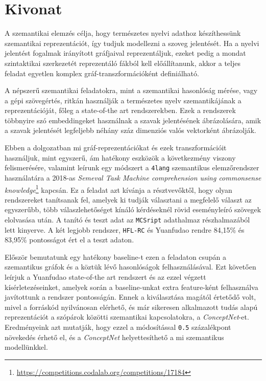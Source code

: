 \chapter*{Kivonat}
A szemantikai elemzés célja, hogy természetes nyelvi adathoz készíthessünk szemantikai reprezentációt, 
így tudjuk modellezni a szoveg jelentését. Ha a nyelvi jelentést fogalmak irányított gráfjaival reprezentáljuk,
ezeket pedig a mondat szintaktikai szerkezetét reprezentáló fákból kell előállítanunk, akkor a teljes feladat egyetlen komplex
gráf-transzformációként definiálható.

A népszerű szemantikai feladatokra, mint a szemantikai hasonlóság mérése, vagy a gépi szövegértés, ritkán használják a természetes
nyelv szemantikájának a reprezentációját, főleg a state-of-the art rendszerekben. Ezek a rendszerek többnyire szó embeddingeket használnak a szavak jelentésének
ábrázolására, amik a szavak jelentését legfeljebb néhány száz dimenziós valós vektorként ábrázolják.

Ebben a dolgozatban mi gráf-reprezentációkat és ezek transzformációit használjuk, mint egyszerű, ám hatékony
eszközök a következmény viszony felismerésére, valamint leírunk egy módszert a \texttt{4lang} szemantikus elemzőrendszer\cite{Recski:2016d} használatára a 2018-as \textit{Semeval Task Machine comprehension using commonsense knowledge}\footnote{\url{https://competitions.codalab.org/competitions/17184}} kapcsán.
Ez a feladat azt kívánja a résztvevőktől, hogy olyan rendszereket tanítsanak fel, amelyek ki tudják választani a megfelelő választ az egyszerűbb, több válaszlehetőséget kínáló
kérdéseknél rövid eseményleíró szövegek elolvasása után. A tanító és teszt adat az \texttt{MCSript}\cite{Ostermann:2018} adathalmaz részhalmazából lett kinyerve. A két legjobb rendszer, \texttt{HFL-RC}\cite{Chen:2018} és Yuanfudao\cite{Wang:2018} rendre 84,15\% és 83,95\% pontosságot ért el a teszt adaton.

Először bemutatunk egy hatékony baseline-t ezen a feladaton csupán a szemantikus gráfok és a köztük lévő hasonlóságok felhasználásával. Ezt követően leírjuk a Yuanfudao state-of-the art
rendszert és az ezzel végzett kísérletezéseinket, amelyek során a baseline-unkat extra feature-ként felhasználva javítottunk a rendszer pontosságán.
Ennek a kiválasztása magától értetődő volt, mivel a forráskód nyilvánosan elérhető, és már sikeresen alkalmazott tudás alapú reprezentációt a szópárok közötti szemantikai kapcsolatokra,
a \textit{ConceptNet}-et. Eredményeink azt mutatják, hogy ezzel a módosítással \texttt{0.5} százalékpont növekedés érhető el, és a \textit{ConceptNet} helyettesíthető a mi szemantikus modellünkkel. 
\vfill


